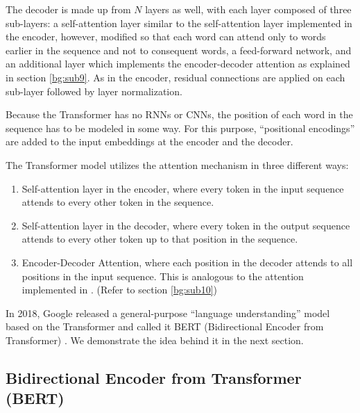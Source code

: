 The decoder is made up from $N$ layers as well, with each layer composed of three sub-layers: a self-attention layer similar to the self-attention layer implemented in the encoder, however, modified so that each word can attend only to words earlier in the sequence and not to consequent words, a feed-forward network, and an additional layer which implements the encoder-decoder attention as explained in section \ref{bg:sub9}. As in the encoder, residual connections are applied on each sub-layer followed by layer normalization.


Because the Transformer has no \ac{RNN}s or \ac{CNN}s, the position of each word in the sequence has to be modeled in some way. For this purpose, \enquote{positional encodings} \cite{gehring2017convolutional} \cite{vaswani2017attention} are added to the input embeddings at the encoder and the decoder.


The Transformer model utilizes the attention mechanism in three different ways:
\begin{enumerate}
	\item Self-attention layer in the encoder, where every token in the input sequence attends to every other token in the sequence.
	\item Self-attention layer in the decoder, where every token in the output sequence attends to every other token up to that position in the sequence.
	\item Encoder-Decoder Attention, where each position in the decoder attends to all positions in the input sequence. This is analogous to the attention implemented in \cite{bahdanau2014neural}. (Refer to section \ref{bg:sub10})
\end{enumerate}


In 2018, Google released a general-purpose \enquote{language understanding} model based on the Transformer and called it \ac{BERT} (Bidirectional Encoder from Transformer) \cite{devlin2018bert}. We demonstrate the idea behind it in the next section.

\subsection{Bidirectional Encoder from Transformer (BERT)} 
\label{bg:s4_sub4}

